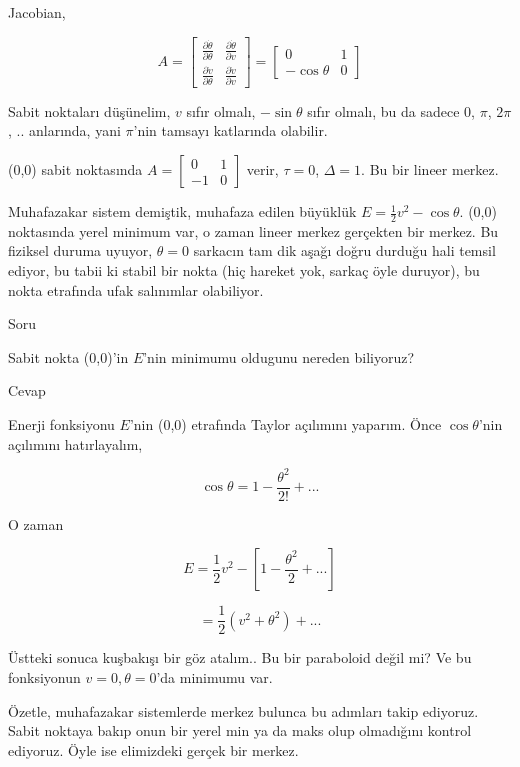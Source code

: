 \documentclass[12pt,fleqn]{article}\usepackage{../../common}
\begin{document}
Jacobian,

$$ A = 
\left[\begin{array}{rr}
\frac{\partial \dot{\theta}}{\partial \theta} & \frac{\partial \dot{\theta}}{\partial v} \\
\frac{\partial \dot{v}}{\partial \theta} & \frac{\partial \dot{v}}{\partial v} 
  \end{array}\right] =
\left[\begin{array}{cc}
0 & 1 \\ -\cos\theta & 0
\end{array}\right]
$$

Sabit noktaları düşünelim, $v$ sıfır olmalı, $-\sin\theta$ sıfır olmalı, bu da
sadece 0, $\pi$, $2\pi$, .. anlarında, yani $\pi$'nin tamsayı katlarında
olabilir.

(0,0) sabit noktasında $A = \left[\begin{array}{rr} 0 & 1 \\ -1 &
 0 \end{array}\right]$ verir, $\tau = 0$, $\Delta = 1$. Bu bir lineer merkez.

Muhafazakar sistem demiştik, muhafaza edilen büyüklük $E = \frac{1}{2}v^2 -
\cos\theta$. (0,0) noktasında yerel minimum var, o zaman lineer merkez gerçekten
bir merkez. Bu fiziksel duruma uyuyor, $\theta=0$ sarkacın tam dik aşağı doğru
durduğu hali temsil ediyor, bu tabii ki stabil bir nokta (hiç hareket yok,
sarkaç öyle duruyor), bu nokta etrafında ufak salınımlar olabiliyor.

Soru

Sabit nokta (0,0)'in $E$'nin minimumu oldugunu nereden biliyoruz?

Cevap

Enerji fonksiyonu $E$'nin (0,0) etrafında Taylor açılımını yaparım. Önce
$\cos\theta$'nin açılımını hatırlayalım,

$$ \cos\theta = 1 - \frac{\theta^2}{2!} + ... $$

O zaman 

$$ E = \frac{1}{2}v^2 - [ 1 - \frac{\theta^2}{2} + ...  ]  $$

$$ = \frac{1}{2} (v^2 + \theta^2) + ... $$

Üstteki sonuca kuşbakışı bir göz atalım.. Bu bir paraboloid değil mi? Ve bu
fonksiyonun $v=0,\theta=0$'da minimumu var.

Özetle, muhafazakar sistemlerde merkez bulunca bu adımları takip ediyoruz. Sabit
noktaya bakıp onun bir yerel min ya da maks olup olmadığını kontrol
ediyoruz. Öyle ise elimizdeki gerçek bir merkez. 
\end{document}
